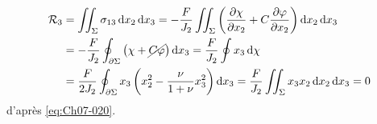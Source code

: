 \begin{equation}
    \begin{split}
        \mathcal{R}_3 &= \iint_{\Sigma} \sigma_{13} \mathop{\mathrm{{}d}}\mathopen{} x_2 \mathop{\mathrm{{}d}}\mathopen{} x_3 = - \frac{F}{J_2} \iint_{\Sigma} \left( \frac{\partial \chi}{\partial x_2} + C \frac{\partial \varphi}{\partial x_2} \right) \mathop{\mathrm{{}d}}\mathopen{} x_2 \mathop{\mathrm{{}d}}\mathopen{} x_3 \\
        &= - \frac{F}{J_2} \oint_{\partial \Sigma} \left( \chi + \cancel{C\varphi} \right) \mathop{\mathrm{{}d}}\mathopen{} x_3 = \frac{F}{J_2} \oint x_3 \mathop{\mathrm{{}d}}\mathopen{} \chi \\
        & = \frac{F}{2J_2} \oint_{\partial \Sigma} x_3 \left( x_2^2 - \frac{\nu}{1+\nu} x_3^2 \right) \mathop{\mathrm{{}d}}\mathopen{} x_3 = \frac{F}{J_2} \iint_{\Sigma} x_3 x_2 \mathop{\mathrm{{}d}}\mathopen{} x_2 \mathop{\mathrm{{}d}}\mathopen{} x_3 = 0
    \end{split}
    \label{eq:Ch07-113}
\end{equation}
d'après \eqref{eq:Ch07-020}.

